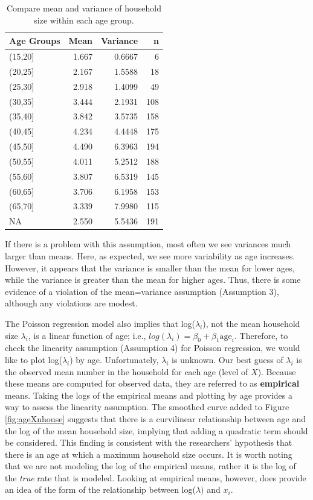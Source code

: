 \documentclass[
]{krantz}
\begin{document}
\begin{table}

\caption{\label{tab:table1chp4}Compare mean and variance of household size within each age group.}
\centering
\begin{tabular}[t]{lrrr}
\toprule
Age Groups & Mean & Variance & n\\
\midrule
(15,20] & 1.667 & 0.6667 & 6\\
(20,25] & 2.167 & 1.5588 & 18\\
(25,30] & 2.918 & 1.4099 & 49\\
(30,35] & 3.444 & 2.1931 & 108\\
(35,40] & 3.842 & 3.5735 & 158\\
\addlinespace
(40,45] & 4.234 & 4.4448 & 175\\
(45,50] & 4.490 & 6.3963 & 194\\
(50,55] & 4.011 & 5.2512 & 188\\
(55,60] & 3.807 & 6.5319 & 145\\
(60,65] & 3.706 & 6.1958 & 153\\
\addlinespace
(65,70] & 3.339 & 7.9980 & 115\\
NA & 2.550 & 5.5436 & 191\\
\bottomrule
\end{tabular}
\end{table}

If there is a problem with this assumption, most often we see variances much larger than means. Here, as expected, we see more variability as age increases. However, it appears that the variance is smaller than the mean for lower ages, while the variance is greater than the mean for higher ages. Thus, there is some evidence of a violation of the mean=variance assumption (Assumption 3), although any violations are modest.

The Poisson regression model also implies that log(\(\lambda_i\)), not the mean household size \(\lambda_i\), is a linear function of age; i.e., \(log(\lambda_i)=\beta_0+\beta_1\textrm{age}_i\). Therefore, to check the linearity assumption (Assumption 4) for Poisson regression, we would like to plot log(\(\lambda_i\)) by age. Unfortunately, \(\lambda_i\) is unknown. Our best guess of \(\lambda_i\) is the observed mean number in the household for each age (level of \(X\)). Because these means are computed for observed data, they are referred to as \textbf{empirical} means. Taking the logs of the empirical means and plotting by age provides a way to assess the linearity assumption. The smoothed curve added to Figure \ref{fig:ageXnhouse} suggests that there is a curvilinear relationship between age and the log of the mean household size, implying that adding a quadratic term should be considered. This finding is consistent with the researchers' hypothesis that there is an age at which a maximum household size occurs. It is worth noting that we are not modeling the log of the empirical means, rather it is the log of the \emph{true} rate that is modeled. Looking at empirical means, however, does provide an idea of the form of the relationship between log(\(\lambda)\) and \(x_i\).
\end{document}
